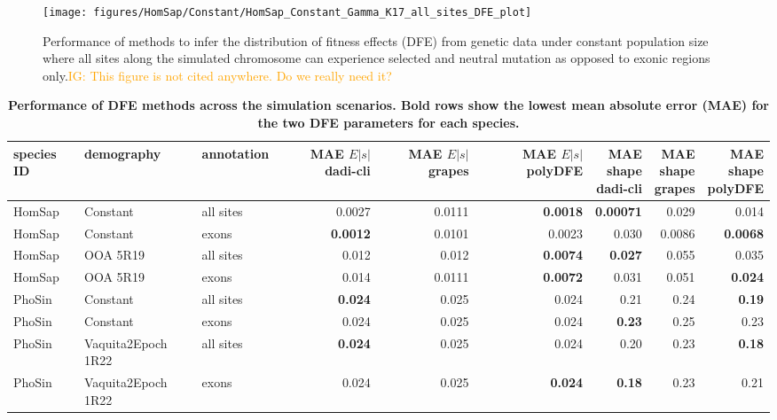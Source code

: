 \documentclass[hidelinks]{article}
\newcommand{\igcomment}[1]{\textcolor{orange}{IG: #1}}
\begin{document}
\begin{figure}[h]
    \centering
    \texttt{[image: figures/HomSap/Constant/HomSap\_Constant\_Gamma\_K17\_all\_sites\_DFE\_plot]}
    \caption{
    \label{fig:homsap-dfe.constant.all_sites}
    Performance of methods to infer the distribution of fitness effects (DFE) from genetic data
    under constant population size  where all sites along the simulated chromosome can experience selected and neutral mutation
    as opposed to exonic regions only.\igcomment{This figure is not cited anywhere. Do we really need it?}
    }
\end{figure}


\begin{table}[ht]
\centering
\small
\caption{\bf{Performance of DFE methods across the simulation scenarios}. 
Bold rows show the lowest mean absolute error (MAE) for the two DFE parameters
for each species.}
\begin{tabular}{lllrrrrrr}
\toprule
species ID & demography & annotation & \makecell{MAE \\ $E|s|$ \\ dadi-cli} & \makecell{MAE \\ $E|s|$ \\ grapes} & \makecell{MAE \\ $E|s|$ \\ polyDFE} & \makecell{MAE \\ shape \\ dadi-cli} & \makecell{MAE \\ shape \\ grapes} & \makecell{MAE \\ shape \\ polyDFE} \\
\midrule
HomSap & Constant & all sites & 0.0027 & 0.0111 & \bf{0.0018} & \bf{0.00071} & 0.029 & 0.014 \\
HomSap & Constant & exons & \bf{0.0012} & 0.0101 & 0.0023 & 0.030 & 0.0086 & \bf{0.0068} \\
HomSap & OOA 5R19 & all sites & 0.012 & 0.012 & \bf{0.0074} & \bf{0.027} & 0.055 & 0.035 \\
HomSap & OOA 5R19 & exons & 0.014 & 0.0111 & \bf{0.0072} & 0.031 & 0.051 & \bf{0.024} \\
PhoSin & Constant & all sites & \bf{0.024} & 0.025 & 0.024 & 0.21 & 0.24 & \bf{0.19} \\
PhoSin & Constant & exons & 0.024 & 0.025 & 0.024 & \bf{0.23} & 0.25 & 0.23 \\
PhoSin & Vaquita2Epoch 1R22 & all sites & \bf{0.024} & 0.025 & 0.024 & 0.20 & 0.23 & \bf{0.18} \\
PhoSin & Vaquita2Epoch 1R22 & exons & 0.024 & 0.025 & \bf{0.024} & \bf{0.18} & 0.23 & 0.21 \\
\bottomrule
\end{tabular}
\label{tab:dfe_table}
\end{table}
\end{document}
